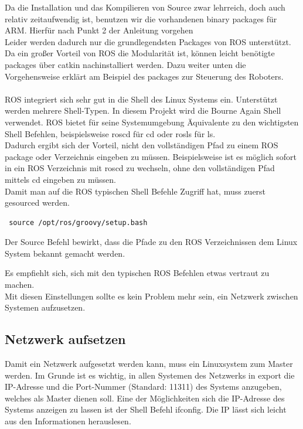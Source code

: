 \documentclass[12pt]{article}
\begin{document}
Da die Installation und das Kompilieren von Source zwar lehrreich, doch auch relativ zeitaufwendig ist, benutzen wir die vorhandenen binary packages für ARM.
Hierfür nach Punkt 2 der Anleitung vorgehen \cite{RosInstall} \\
Leider werden dadurch nur die grundlegendsten Packages von ROS unterstützt.
Da ein großer Vorteil von ROS die Modularität ist, können leicht benötigte packages über catkin nachinstalliert werden.
Dazu weiter unten die Vorgehensweise erklärt am Beispiel des packages zur Steuerung des Roboters.\\
\\
ROS integriert sich sehr gut in die Shell des Linux Systems ein.
Unterstützt werden mehrere Shell-Typen. In diesem Projekt wird die Bourne Again Shell verwendet.
ROS bietet für seine Systemumgebung Äquivalente zu den wichtigsten Shell Befehlen, beispielsweise roscd für cd oder rosls für ls. \\
Dadurch ergibt sich der Vorteil, nicht den vollständigen Pfad zu einem ROS package oder Verzeichnis eingeben zu müssen. Beispielsweise ist es möglich sofort in ein ROS Verzeichnis mit roscd zu wechseln, ohne den vollständigen Pfad mittels cd eingeben zu müssen. \\
Damit man auf die ROS typischen Shell Befehle Zugriff hat, muss zuerst gesourced werden.

 \begin{lstlisting}
 source /opt/ros/groovy/setup.bash
 \end{lstlisting}

Der Source Befehl bewirkt, dass die Pfade zu den ROS Verzeichnissen dem Linux System bekannt gemacht werden.

Es empfiehlt sich, sich mit den typischen ROS Befehlen etwas vertraut zu machen. \cite{RosTuts} \\
Mit diesen Einstellungen sollte es kein Problem mehr sein, ein Netzwerk zwischen Systemen aufzusetzen.
\subsection{Netzwerk aufsetzen}
Damit ein Netzwerk aufgesetzt werden kann, muss ein Linuxsystem zum Master werden.
Im Grunde ist es wichtig, in allen Systemen des Netzwerks in export die IP-Adresse und die Port-Nummer (Standard: 11311) des Systems anzugeben, welches als Master dienen soll.
Eine der Möglichkeiten sich die IP-Adresse des Systems anzeigen zu lassen ist der Shell Befehl ifconfig.
Die IP lässt sich leicht aus den Informationen herauslesen.
\end{document}
